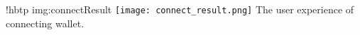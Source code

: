 \namedfigure
{!hbtp}
{img:connectResult}
{\texttt{[image: connect\_result.png]}}
{The user experience of connecting wallet.}

